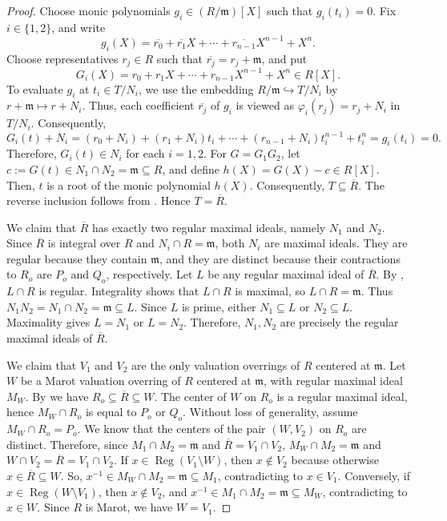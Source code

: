 \documentclass[12pt]{article}
\newcommand{\Reg}{\operatorname{Reg}}
\begin{document}
\begin{proof}
		Choose monic polynomials $g_i\in(R/\mathfrak{m})[X]$ such that $g_i(t_i)=0$. Fix $i\in\{1,2\}$, and write
		\[
		g_i(X)=\overline{r_0}+\overline{r_1}X+\cdots+\overline{r_{n-1}}X^{n-1}+X^n.
		\]
		Choose representatives $r_j\in R$ such that $\overline{r_j}=r_j+\mathfrak{m}$, and put
		\[
		G_i(X)=r_0+r_1X+\cdots+r_{n-1}X^{n-1}+X^n \in R[X].
		\]
		To evaluate $g_i$ at $t_i\in T/N_i$, we use the embedding $ R/\mathfrak{m}\hookrightarrow T/N_i$ by $ r+\mathfrak{m}\longmapsto r+N_i.$ Thus, each coefficient $\overline{r_j}$ of $g_i$
		is viewed as $\varphi_i(r_j)=r_j+N_i$ in $T/N_i$. Consequently, $$G_i(t)+N_i =(r_0+N_i)+(r_1+N_i)t_i+\cdots +(r_{n-1}+N_i)t_i^{n-1}+t_i^n=g_i(t_i)=0. $$ Therefore, $G_i(t)\in N_i$ for each $i=1,2$. For $G=G_1G_2$, let $c:=G(t)\in N_1\cap N_2= \mathfrak{m} \subseteq R$, and define $h(X)=G(X)-c\in R[X]$. Then, $t$ is a root of the monic polynomial $h(X)$. Consequently, $T\subseteq\overline R$. The reverse inclusion follows from \cite[Theorem 9.3]{huckaba}. Hence $T=\overline R$.
		
		\smallskip We claim that $\overline R$ has exactly two regular maximal ideals, namely $N_1$ and $N_2$. Since $\overline R$ is integral over $R$ and $N_i\cap R=\mathfrak{m}$, both $N_i$ are maximal ideals. They are regular because they contain $\mathfrak{m}$, and they are distinct because their contractions to $R_o$ are $P_o$ and $Q_o$, respectively. Let $L$ be any regular maximal ideal of $\overline R$. By \cite[Theorem 2.4]{marot}, $L\cap R$ is regular. Integrality shows that $L\cap R$ is maximal, so $L\cap R=\mathfrak{m}$. Thus $N_1N_2=N_1\cap N_2=\mathfrak{m}\subseteq L$. Since $L$ is prime, either $N_1\subseteq L$ or $N_2\subseteq L$. Maximality gives $L=N_1$ or $L=N_2$. Therefore, $N_1,N_2$ are precisely the regular maximal ideals of $\overline R$.
		
		\smallskip We claim that $V_1$ and $V_2$ are the only valuation overrings of $R$ centered at $\mathfrak{m}$. Let $W$ be a Marot valuation overring of $R$ centered at $\mathfrak{m}$, with regular maximal ideal $M_W$. By \cite[Theorem 9.3]{huckaba} we have $R_o\subseteq \overline R\subseteq W$. The center of $W$ on $R_o$ is a regular maximal ideal, hence $M_W\cap R_o$ is equal to $P_o$ or $Q_o$. Without loss of generality, assume $M_W\cap R_o=P_o$. We know that the centers of the pair $(W,V_2)$ on $R_o$ are distinct. Therefore, since $M_1\cap M_2=\mathfrak{m}$ and $\overline{R} =V_1\cap V_2$, $M_W\cap M_2=\mathfrak{m}$ and $W\cap V_2=\overline R=V_1\cap V_2$. If $x\in\Reg(V_1\setminus W)$, then $x\notin V_2$ because otherwise $x\in\overline R\subseteq W$. So, $x^{-1}\in M_W\cap M_2=\mathfrak{m}\subseteq M_1$, contradicting to $x\in V_1$. Conversely, if $x\in\Reg(W\setminus V_1)$, then $x\notin V_2$, and $x^{-1}\in M_1\cap M_2=\mathfrak{m}\subseteq M_W$, contradicting to $x\in W$. Since $R$ is Marot, we have $W=V_1$.
		

\end{proof}
\end{document}
